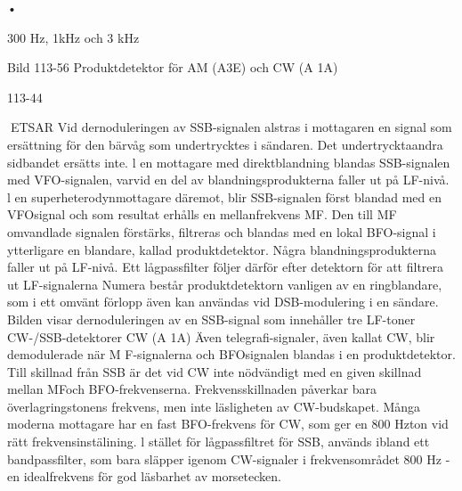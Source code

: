 \documentclass[a4paper,twoside,twocolumn,openright]{book}
\begin{document}
{{{{{{{•

300 Hz, 1kHz och 3 kHz

Bild 113-56 Produktdetektor för AM (A3E) och CW (A 1A)

113-44

ETSAR
Vid dernoduleringen av SSB-signalen
alstras i mottagaren en signal som ersättning för den bärvåg som undertrycktes i
sändaren. Det undertrycktaandra sidbandet
ersätts inte.
l en mottagare med direktblandning blandas SSB-signalen med VFO-signalen, varvid en del av blandningsprodukterna faller ut
på LF-nivå.
l en superheterodynmottagare däremot,
blir SSB-signalen först blandad med en VFOsignal och som resultat erhålls en mellanfrekvens MF. Den till MF omvandlade signalen förstärks, filtreras och blandas med en
lokal BFO-signal i ytterligare en blandare,
kallad produktdetektor. Några blandningsprodukterna faller ut på LF-nivå. Ett lågpassfilter följer därför efter detektorn för att filtrera
ut LF-signalerna
Numera består produktdetektorn vanligen av en ringblandare, som i ett omvänt
förlopp även kan användas vid DSB-modulering i en sändare. Bilden visar dernoduleringen av en SSB-signal som innehåller tre
LF-toner
CW-/SSB-detektorer CW (A 1A)
Även telegrafi-signaler, även kallat CW, blir
demodulerade när M F-signalerna och BFOsignalen blandas i en produktdetektor.
Till skillnad från SSB är det vid CW inte nödvändigt med en given skillnad mellan MFoch BFO-frekvenserna. Frekvensskillnaden
påverkar bara överlagringstonens frekvens,
men inte läsligheten av CW-budskapet.
Många moderna mottagare har en fast
BFO-frekvens för CW, som ger en 800 Hzton vid rätt frekvensinstälining. l stället för
lågpassfiltret för SSB, används ibland ett
bandpassfilter, som bara släpper igenom
CW-signaler i frekvensområdet 800 Hz -en
idealfrekvens för god läsbarhet av morsetecken.

}}}}}}}
\end{document}
